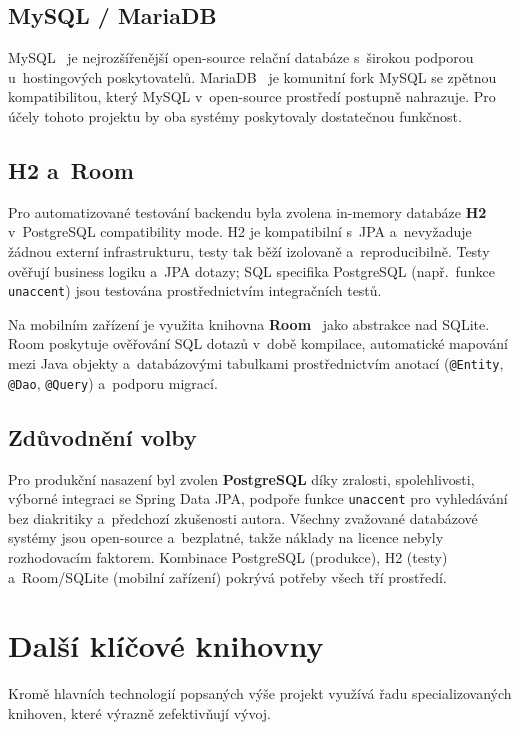 \subsection{MySQL / MariaDB}

MySQL~\cite{mysql} je nejrozšířenější open-source relační databáze s~širokou podporou u~hostingových poskytovatelů. MariaDB~\cite{mariadb} je komunitní fork MySQL se zpětnou kompatibilitou, který MySQL v~open-source prostředí postupně nahrazuje. Pro účely tohoto projektu by oba systémy poskytovaly dostatečnou funkčnost.

\subsection{H2 a~Room}

Pro automatizované testování backendu byla zvolena in-memory databáze \textbf{H2}~\cite{h2database} v~PostgreSQL compatibility mode. H2 je kompatibilní s~JPA a~nevyžaduje žádnou externí infrastrukturu, testy tak běží izolovaně a~reproducibilně. Testy ověřují business logiku a~JPA dotazy; SQL specifika PostgreSQL (např.\ funkce \texttt{unaccent}) jsou testována prostřednictvím integračních testů.

Na mobilním zařízení je využita knihovna \textbf{Room}~\cite{androidroom} jako abstrakce nad SQLite. Room poskytuje ověřování SQL dotazů v~době kompilace, automatické mapování mezi Java objekty a~databázovými tabulkami prostřednictvím anotací (\texttt{@Entity}, \texttt{@Dao}, \texttt{@Query}) a~podporu migrací.

\subsection{Zdůvodnění volby}

Pro produkční nasazení byl zvolen \textbf{PostgreSQL} díky zralosti, spolehlivosti, výborné integraci se Spring Data JPA, podpoře funkce \texttt{unaccent} pro vyhledávání bez diakritiky a~předchozí zkušenosti autora. Všechny zvažované databázové systémy jsou open-source a~bezplatné, takže náklady na licence nebyly rozhodovacím faktorem. Kombinace PostgreSQL (produkce), H2 (testy) a~Room/SQLite (mobilní zařízení) pokrývá potřeby všech tří prostředí.


\section{Další klíčové knihovny}

Kromě hlavních technologií popsaných výše projekt využívá řadu specializovaných knihoven, které výrazně zefektivňují vývoj.

